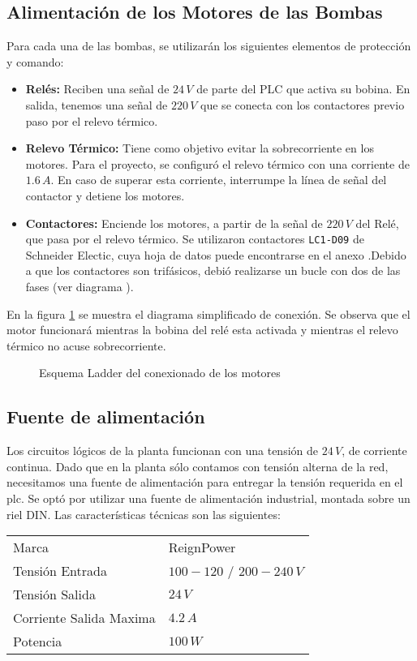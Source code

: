\subsection{Alimentación de los Motores de las Bombas}
Para cada una de las bombas, se utilizarán los siguientes elementos de 
protección y comando:
\begin{itemize}
 \item \textbf{Relés:} Reciben una  señal de $24\,V$ de parte del PLC que activa
 su bobina. En salida, tenemos una señal de $220\,V$ que se conecta con los 
 contactores previo paso por el relevo térmico.
 \item \textbf{Relevo Térmico:} Tiene como objetivo evitar la sobrecorriente en
 los motores. Para el proyecto, se configuró el relevo térmico con una corriente
 de $1.6\,A$. En caso de superar esta corriente, interrumpe la línea de señal
 del contactor y detiene los motores.
 \item \textbf{Contactores:} Enciende los motores, a partir de la señal de 
 $220\,V$ del Relé, que pasa por el relevo térmico. Se utilizaron 
contactores \verb|LC1-D09| de Schneider Electic, cuya hoja de datos 
puede encontrarse en el anexo .Debido a que los 
contactores
 son trifásicos, debió realizarse un bucle con dos de las fases (ver diagrama
 ).
\end{itemize}

En la figura \ref{fig:diagramaLadderContactor} se muestra el diagrama
simplificado de conexión. Se observa que  el motor funcionará mientras la bobina
del relé esta activada y mientras el relevo térmico no acuse sobrecorriente.

\begin{figure}
 \centering
 \caption{Esquema Ladder del conexionado de los motores}
 \label{fig:diagramaLadderContactor}
\end{figure}

\subsection{Fuente de alimentación}
Los circuitos lógicos de la planta funcionan con una tensión de $24\,V$, de
corriente continua. Dado que en la planta sólo contamos con tensión alterna de
la red, necesitamos una fuente de alimentación para entregar la tensión
requerida en el \gls{plc}. Se optó por utilizar una fuente de alimentación
industrial, montada sobre un riel DIN. Las características técnicas son las
siguientes:
\begin{center}
\begin{tabular}{|l|l|}
\hline
Marca & ReignPower\\
Tensión Entrada& $100-120$ / $200-240\,V$\\
Tensión Salida& $24\,V$\\
Corriente Salida Maxima& $4.2\,A$\\
Potencia & $100\,W$\\
\hline
\end{tabular}
\end{center}

